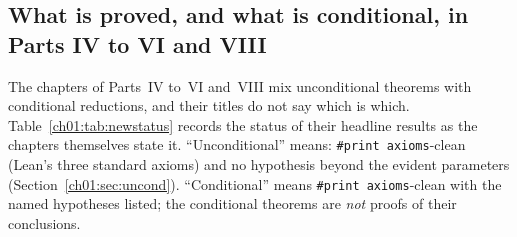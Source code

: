 \subsection{What is proved, and what is conditional, in Parts IV to VI and VIII}\label{ch01:sec:newstatus}

The chapters of Parts~IV to~VI and~VIII mix unconditional theorems with conditional reductions, and their
titles do not say which is which. Table~\ref{ch01:tab:newstatus} records the status of their headline
results as the chapters themselves state it. ``Unconditional'' means: \texttt{\#print axioms}-clean (Lean's
three standard axioms) and no hypothesis beyond the evident parameters (Section~\ref{ch01:sec:uncond}).
``Conditional'' means \texttt{\#print axioms}-clean with the named hypotheses listed; the conditional
theorems are \emph{not} proofs of their conclusions.

